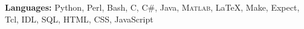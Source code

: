 

\textbf{Languages:} Python, Perl, Bash, C, C\#, Java, \textsc{Matlab}, \LaTeX, Make, Expect, Tcl, IDL, SQL, HTML, CSS, JavaScript
